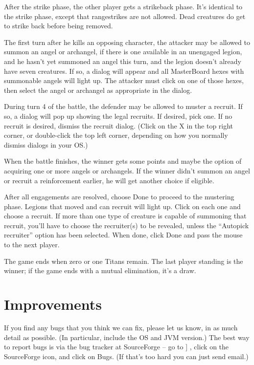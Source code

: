 \documentclass{article}
\begin{document}
After the strike phase, the other player gets a strikeback phase. It's
identical to the strike phase, except that rangestrikes are not allowed.
Dead creatures do get to strike back before being removed.

The first turn after he kills an opposing character, the attacker may be
allowed to summon an angel or archangel, if there is one available in an
unengaged legion, and he hasn't yet summoned an angel this turn, and the
legion doesn't already have seven creatures. If so, a dialog will appear
and all MasterBoard hexes with summonable angels will light up. The
attacker must click on one of those hexes, then select the angel or
archangel as appropriate in the dialog.

During turn 4 of the battle, the defender may be allowed to muster a recruit.
If so, a dialog will pop up showing the legal recruits. If desired, pick one.
If no recruit is desired, dismiss the recruit dialog. (Click on the X in the
top right corner, or double-click the top left corner, depending on how you
normally dismiss dialogs in your OS.)

When the battle finishes, the winner gets some points and maybe the option of
acquiring one or more angels or archangels. If the winner didn't summon
an angel or recruit a reinforcement earlier, he will get another choice if
eligible.

After all engagements are resolved, choose Done to proceed to the mustering 
phase. Legions that moved and can recruit will light up. Click on each one 
and choose a recruit. If more than one type of creature is capable of 
summoning that recruit, you'll have to choose the recruiter(s) to be 
revealed, unless the ``Autopick recruiter'' option has been selected.
When done, click Done and pass the mouse to the next player.

The game ends when zero or one Titans remain. The last player standing is
the winner; if the game ends with a mutual elimination, it's a draw.

\section{Improvements}

If you find any bugs that you think we can fix, please let us know, in
as much detail as possible. (In particular, include the OS and JVM 
version.) The best way to report bugs is via the bug tracker at 
SourceForge -- go to ]
,
click on the SourceForge icon, and click on Bugs. (If that's too hard
you can just send email.)
\end{document}
